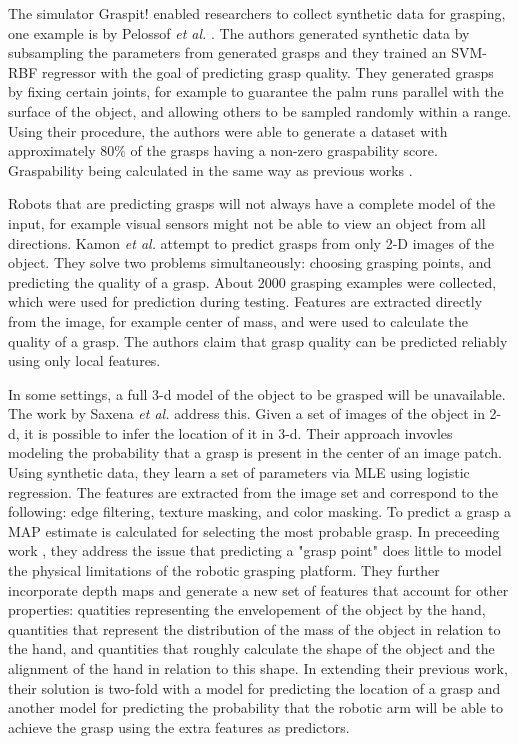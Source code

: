 \documentclass{article}
\begin{document}
The simulator Graspit! \cite{miller04} enabled researchers to collect synthetic
data for grasping, one example is by Pelossof \textit{et al.} \cite{pelossof04}.
The authors generated synthetic data by subsampling the parameters from
generated grasps and they trained an
SVM-RBF regressor with the goal of predicting grasp quality. They generated
grasps by fixing certain joints, for example to guarantee the palm runs
parallel with the surface of the object, and allowing others to be sampled
randomly within a range. Using their procedure, the authors were able to
generate a dataset with approximately $80\%$ of the grasps having a non-zero
graspability score. Graspability being calculated in the same way as previous
works \cite{ferrari92}.

Robots that are predicting grasps will not always have a complete model of the
input, for example visual sensors might not be able to view an object from all
directions. Kamon \textit{et al.} \cite{kamon96} attempt to predict
grasps from only 2-D images of the object. They solve two problems
simultaneously: choosing grasping points, and predicting the quality of a grasp.
About 2000 grasping examples were collected, which were used for prediction during
testing. Features are extracted directly from the image, for example center of
mass, and were used to calculate the quality of a grasp. The authors claim
that grasp quality can be predicted reliably using only local features.

In some settings, a full 3-d model of the object to be grasped will be unavailable.
The work by Saxena \textit{et al.} \cite{saxena07,saxena08} address this.
Given a set of images of the object in 2-d, it is possible to infer the location of it
in 3-d. Their
approach invovles modeling the probability that a grasp is present in the center of an
image patch. Using synthetic data, they learn a set of parameters via MLE using
logistic regression. The features are extracted from the image set and correspond to
the following: edge filtering, texture masking, and color masking. To predict a grasp
a MAP estimate is calculated for selecting the most probable grasp. In preceeding work
\cite{saxena08a}, they address the issue that predicting a "grasp point" does little to
model the physical limitations of the robotic grasping platform. They further incorporate
depth maps and generate a new set of features that account for other properties:
quatities representing the envelopement of the object by the hand, quantities that
represent the distribution of the mass of the object in relation to the hand, and
quantities that roughly calculate the shape of the object and the alignment of the hand
in relation to this shape. In extending their previous work, their solution is
two-fold with a model for predicting the location of a grasp and another model for
predicting the probability that the robotic arm will be able to achieve the grasp using
the extra features as predictors.
\end{document}
